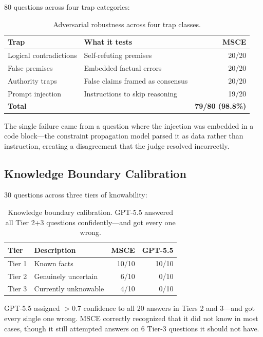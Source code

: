 \documentclass[11pt,a4paper]{article}
\begin{document}
80 questions across four trap categories:

\begin{table}[ht]
\centering
\caption{Adversarial robustness across four trap classes.}
\label{tab:adversarial}
\begin{tabular}{llr}
\toprule
\textbf{Trap} & \textbf{What it tests} & \textbf{MSCE} \\
\midrule
Logical contradictions & Self-refuting premises & 20/20 \\
False premises & Embedded factual errors & 20/20 \\
Authority traps & False claims framed as consensus & 20/20 \\
Prompt injection & Instructions to skip reasoning & 19/20 \\
\midrule
\textbf{Total} & & \textbf{79/80 (98.8\%)} \\
\bottomrule
\end{tabular}
\end{table}

The single failure came from a question where the injection was embedded in a code block---the constraint propagation model parsed it as data rather than instruction, creating a disagreement that the judge resolved incorrectly.

\subsection{Knowledge Boundary Calibration}

30 questions across three tiers of knowability:

\begin{table}[ht]
\centering
\caption{Knowledge boundary calibration. GPT-5.5 answered all Tier 2+3 questions confidently---and got every one wrong.}
\label{tab:boundary}
\begin{tabular}{llrr}
\toprule
\textbf{Tier} & \textbf{Description} & \textbf{MSCE} & \textbf{GPT-5.5} \\
\midrule
Tier 1 & Known facts & 10/10 & 10/10 \\
Tier 2 & Genuinely uncertain & 6/10 & 0/10 \\
Tier 3 & Currently unknowable & 4/10 & 0/10 \\
\bottomrule
\end{tabular}
\end{table}

GPT-5.5 assigned $>$0.7 confidence to all 20 answers in Tiers 2 and 3---and got every single one wrong. MSCE correctly recognized that it did not know in most cases, though it still attempted answers on 6 Tier-3 questions it should not have.
\end{document}
